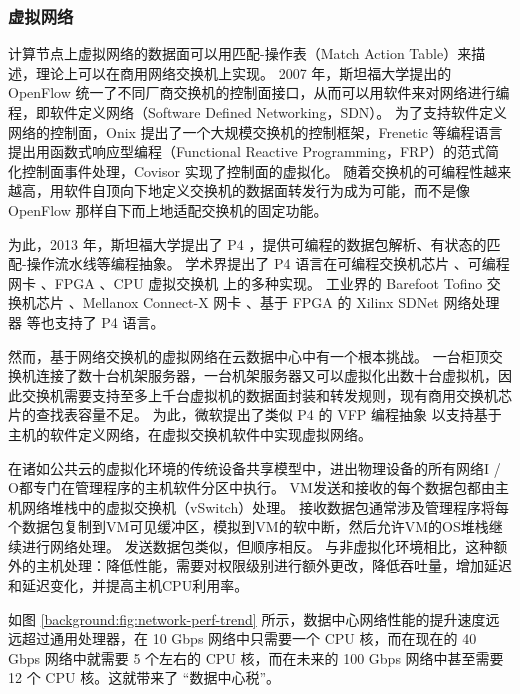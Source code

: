 \subsubsection{虚拟网络}

计算节点上虚拟网络的数据面可以用匹配-操作表（Match Action Table）来描述，理论上可以在商用网络交换机上实现。
2007 年，斯坦福大学提出的 OpenFlow \cite{mckeown2008openflow} 统一了不同厂商交换机的控制面接口，从而可以用软件来对网络进行编程，即软件定义网络（Software Defined Networking，SDN）。
为了支持软件定义网络的控制面，Onix \cite{koponen2010onix} 提出了一个大规模交换机的控制框架，Frenetic 等编程语言 \cite{voellmy2010nettle,foster2011frenetic} 提出用函数式响应型编程（Functional Reactive Programming，FRP）的范式简化控制面事件处理，Covisor \cite{jin2015covisor} 实现了控制面的虚拟化。
随着交换机的可编程性越来越高，用软件自顶向下地定义交换机的数据面转发行为成为可能，而不是像 OpenFlow 那样自下而上地适配交换机的固定功能。

为此，2013 年，斯坦福大学提出了 P4 \cite{bosshart2014p4}，提供可编程的数据包解析、有状态的匹配-操作流水线等编程抽象。
学术界提出了 P4 语言在可编程交换机芯片 \cite{bosshart2013forwarding}、可编程网卡 \cite{kaufmann2016high}、FPGA \cite{wang2017p4fpga}、CPU 虚拟交换机 \cite{shahbaz2016pisces} 上的多种实现。
工业界的 Barefoot Tofino 交换机芯片 \cite{barefoot-tofino}、Mellanox Connect-X 网卡 \cite{mellanox}、基于 FPGA 的 Xilinx SDNet 网络处理器 \cite{xilinx-p4} 等也支持了 P4 语言。

然而，基于网络交换机的虚拟网络在云数据中心中有一个根本挑战。
一台柜顶交换机连接了数十台机架服务器，一台机架服务器又可以虚拟化出数十台虚拟机，因此交换机需要支持至多上千台虚拟机的数据面封装和转发规则，现有商用交换机芯片的查找表容量不足。
为此，微软提出了类似 P4 的 VFP 编程抽象 \cite{firestone2017vfp} 以支持基于主机的软件定义网络，在虚拟交换机软件中实现虚拟网络。

在诸如公共云的虚拟化环境的传统设备共享模型中，进出物理设备的所有网络I / O都专门在管理程序的主机软件分区中执行。 VM发送和接收的每个数据包都由主机网络堆栈中的虚拟交换机（vSwitch）处理。 接收数据包通常涉及管理程序将每个数据包复制到VM可见缓冲区，模拟到VM的软中断，然后允许VM的OS堆栈继续进行网络处理。 发送数据包类似，但顺序相反。 与非虚拟化环境相比，这种额外的主机处理：降低性能，需要对权限级别进行额外更改，降低吞吐量，增加延迟和延迟变化，并提高主机CPU利用率。

如图 \ref{background:fig:network-perf-trend} 所示，数据中心网络性能的提升速度远远超过通用处理器，在 10 Gbps 网络中只需要一个 CPU 核，而在现在的 40 Gbps 网络中就需要 5 个左右的 CPU 核，而在未来的 100 Gbps 网络中甚至需要 12 个 CPU 核。这就带来了 ``数据中心税''。





